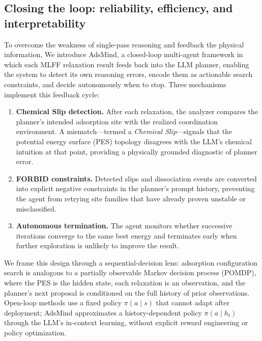 


\subsection{Closing the loop: reliability, efficiency, and interpretability}
To overcome the weakness of single-pass reasoning and feedback the physical information, We introduce AdsMind, a closed-loop multi-agent framework in which each MLFF relaxation result feeds back into the LLM planner, enabling the system to detect its own reasoning errors, encode them as actionable search constraints, and decide autonomously when to stop.
Three mechanisms implement this feedback cycle:

\begin{enumerate}
    \item \textbf{Chemical Slip detection.} After each relaxation, the analyzer compares the planner's intended adsorption site with the realized coordination environment. A mismatch---termed a \textit{Chemical Slip}---signals that the potential energy surface (PES) topology disagrees with the LLM's chemical intuition at that point, providing a physically grounded diagnostic of planner error.
    \item \textbf{FORBID constraints.} Detected slips and dissociation events are converted into explicit negative constraints in the planner's prompt history, preventing the agent from retrying site families that have already proven unstable or misclassified.
    \item \textbf{Autonomous termination.} The agent monitors whether successive iterations converge to the same best energy and terminates early when further exploration is unlikely to improve the result.
\end{enumerate}

We frame this design through a sequential-decision lens: adsorption configuration search is analogous to a partially observable Markov decision process (POMDP), where the PES is the hidden state, each relaxation is an observation, and the planner's next proposal is conditioned on the full history of prior observations.
Open-loop methods use a fixed policy $\pi(a \mid s)$ that cannot adapt after deployment; AdsMind approximates a history-dependent policy $\pi(a \mid h_t)$ through the LLM's in-context learning, without explicit reward engineering or policy optimization.


